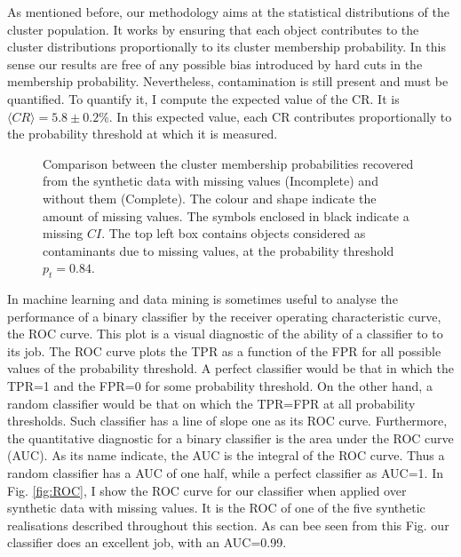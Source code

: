 As mentioned before, our methodology aims at the statistical distributions of the cluster population. It works by ensuring that each object contributes to the cluster distributions proportionally to its cluster membership probability. In this sense our results are free of any possible bias introduced by hard cuts in the membership probability. Nevertheless, contamination is still present and must be quantified. To quantify it, I compute the expected value of the CR. It is $\langle CR \rangle=5.8\pm 0.2$\%. In this expected value, each CR contributes proportionally to the  probability threshold at which it is measured. 

\begin{figure}[!htp]
\begin{center}
\caption{Comparison between the cluster membership probabilities recovered from the synthetic data with missing values (Incomplete) and without them (Complete). The colour and shape indicate the amount of missing values. The symbols enclosed in black indicate a missing $CI$. The top left box contains objects considered as contaminants due to missing values, at the probability threshold $p_t=0.84$.}
\label{figure:IncVsCom}
\end{center}
\end{figure}

In machine learning and data mining is sometimes useful to analyse the performance of a binary classifier by the receiver operating characteristic curve, the ROC curve.  This plot is a visual diagnostic of the ability of a classifier to to its job. The ROC curve plots the TPR as a function of the FPR for all possible values of the probability threshold. A perfect classifier would be that in which the TPR=1 and the FPR=0 for some probability threshold. On the other hand, a random classifier would be that on which the TPR=FPR at all probability thresholds. Such classifier has a line of slope one as its ROC curve. Furthermore, the quantitative diagnostic for a binary classifier is the area under the ROC curve (AUC). As its name indicate, the AUC is the integral of the ROC curve. Thus a random classifier has a AUC of one half, while a perfect classifier as AUC=1. In Fig. \ref{fig:ROC}, I show the ROC curve for our classifier when applied over synthetic data with missing values. It is the ROC of one of the five synthetic realisations described throughout this section. As can bee seen from this Fig. our classifier does an excellent job, with an AUC=0.99.

